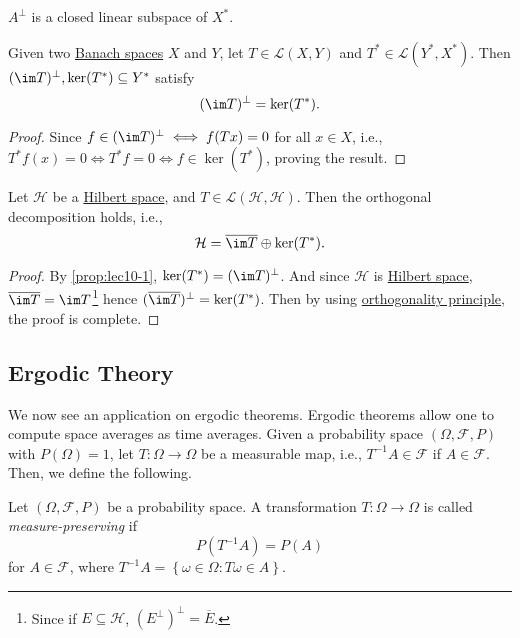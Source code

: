 \begin{note}
	\(A^\perp\) is a closed linear subspace of \(X^{\ast} \).
\end{note}

\begin{proposition}\label{prop:lec10-1}
	Given two  \hyperref[def:Banach-space]{Banach spaces} \(X\) and \(Y\), let \(T\in \mathcal{L} (X, Y)\) and \(T^{\ast} \in \mathcal{L} (Y^{\ast} , X^{\ast} )\). Then \((\im T)^\perp, \ker (T^{\ast} ) \subseteq Y^{\ast}\) satisfy
	\[
		(\im T)^\perp = \ker (T^{\ast} ).
	\]
\end{proposition}
\begin{proof}
	Since \(f\in (\im T)^\perp \iff f(Tx)= 0\) for all \(x\in X\), i.e., \(T^{\ast} f(x) = 0 \iff T^{\ast} f = 0\iff f\in \ker(T^{\ast})\), proving the result.
\end{proof}

\begin{corollary}
	Let \(\mathcal{H} \) be a \hyperref[def:Hilbert-space]{Hilbert space}, and \(T\in \mathcal{L} (\mathcal{H} , \mathcal{H} )\). Then the orthogonal decomposition holds, i.e.,
	\[
		\mathcal{H} = \overline{\im T}\oplus \ker (T^{\ast} ).
	\]
\end{corollary}
\begin{proof}
	By \autoref{prop:lec10-1}, \(\ker (T^{\ast} ) = (\im T)^\perp\). And since \(\mathcal{H}\) is \hyperref[def:Hilbert-space]{Hilbert space}, \(\overline{\im T} = \im T\)\footnote{Since if \(E \subseteq \mathcal{H} \), \((E^\perp)^\perp = \overline{E}\).} hence \((\overline{\im T})^{\perp} = \ker (T^{\ast}) \). Then by using \hyperref[thm:orthogonality-principle]{orthogonality principle}, the proof is complete.
\end{proof}

\subsection{Ergodic Theory}
We now see an application on ergodic theorems. Ergodic theorems allow one to compute space averages as time averages. Given a probability space \((\Omega , \mathcal{F} , P)\) with \(P(\Omega ) = 1\), let \(T\colon \Omega \to \Omega \) be a measurable map, i.e., \(T^{-1} A \in \mathcal{F} \) if \(A\in \mathcal{F} \). Then, we define the following.

\begin{definition}\label{def:measure-preserving}
	Let \((\Omega , \mathcal{F} , P)\) be a probability space. A transformation \(T\colon \Omega \to \Omega \) is called \emph{measure-preserving} if
	\[
		P(T^{-1} A) = P(A)
	\]
	for \(A\in \mathcal{F} \), where \(T^{-1} A = \left\{ \omega \in \Omega \colon T \omega \in A \right\} \).
\end{definition}

